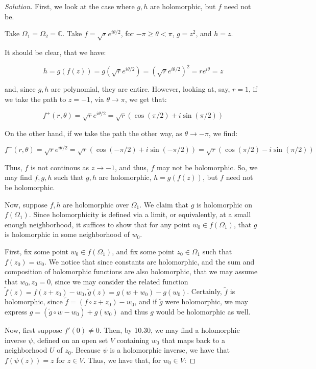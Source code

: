 \documentclass[10pt]{article}
\begin{document}
\begin{proof}[Solution]

First, we look at the case where $g,h$ are holomorphic, but $f$ need not be.

Take $\Omega_1 = \Omega_2 = \mathbb{C}$. Take $f = \sqrt{r} e^{i \theta/2}$, for $-\pi \geq \theta < \pi$, $g = z^2$, and $h = z$.

It should be clear, that we have:

$$ h = g(f(z)) = g( \sqrt{r} e^{i \theta/2}) = (\sqrt{r} e^{i \theta/2})^2 = r e^{i \theta} = z $$

and, since $g,h$ are polynomial, they are entire. However, looking at, say, $r = 1$, if we take the path to $z = -1$, via $\theta \to \pi$, we get that:

$$ f^+(r, \theta)= \sqrt{r} e^{i\theta/2} = \sqrt{r} (\cos(\pi/2) + i \sin(\pi/2))$$

On the other hand, if we take the path the other way, as $\theta \to -\pi$, we find:

$$ f^-(r, \theta)= \sqrt{r} e^{i\theta/2} = \sqrt{r} (\cos(-\pi/2) + i \sin(-\pi/2)) =  \sqrt{r} (\cos(\pi/2) - i \sin(\pi/2))$$

Thus, $f$ is not continous as $z \to -1$, and thus, $f$ may not be holomorphic. So, we may find $f,g,h$ such that $g,h$ are holomorphic,  $h = g(f(z))$, but $f$ need not be holomorphic.

Now, suppose $f,h$ are holomorphic over $\Omega_1$. We claim that $g$ is holomorphic on $f(\Omega_1)$. Since holomorphicity is defined via a limit, or equivalently, at a small enough neighborhood, it suffices to show that for any point $w_0 \in f(\Omega_1)$, that $g$ is holomorphic in some neighborhood of $w_0$.

First, fix some point $w_0 \in f(\Omega_1)$, and fix some point $z_0 \in \Omega_1$ such that $f(z_0) = w_0$. We notice that since constants are holomorphic, and the sum and composition of holomorphic functions are also holomorphic, that we may assume that $w_0, z_0 = 0$, since we may consider the related function $\tilde{f}(z) = f(z + z_0) - w_0, \tilde{g}(z) = g(w + w_0) - g(w_0)$. Certainly, $\tilde{f}$ is holomorphic, since $\tilde{f} =  (f \circ z + z_0) - w_0$, and if $\tilde{g}$ were holomorphic, we may express $g =  (\tilde{g} \circ w - w_0) + g(w_0)$ and thus $g$ would be holomorphic as well.

Now, first suppose $f'(0) \not = 0$. Then, by 10.30, we may find a holomorphic inverse $\psi$, defined on an open set $V$ containing $w_0$ that maps back to a neighborhood $U$ of $z_0$. Because $\psi$ is a holomorphic inverse, we have that $f(\psi(z)) = z$ for $z \in V$. Thus, we have that, for $w_0 \in V$:


\end{proof}
\end{document}
